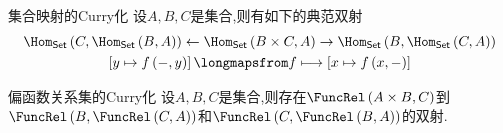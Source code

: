\begin{proposition}{集合映射的Curry化}{}
	设$A,B,C$是集合,则有如下的典范双射
	\begin{gather*}
		\Hom_{\mathsf{Set}}\left(C,\Hom_{\mathsf{Set}}\left(B,A\right)\right)\leftarrow\Hom_{\mathsf{Set}}\left(B\times C,A\right)\rightarrow\Hom_{\mathsf{Set}}\left(B,\Hom_{\mathsf{Set}}\left(C,A\right)\right)\\
		\left[y\mapsto f\left(-,y\right)\right]\longmapsfrom f\longmapsto\left[x\mapsto f\left(x,-\right)\right]
	\end{gather*}
\end{proposition}

\begin{corollary}{偏函数关系集的Curry化}{}
	设$A,B,C$是集合,则存在$\FuncRel\left(A\times B,C\right)$到$\FuncRel\left(B,\FuncRel\left(C,A\right)\right)$和$\FuncRel\left(C,\FuncRel\left(B,A\right)\right)$的双射.
\end{corollary}









